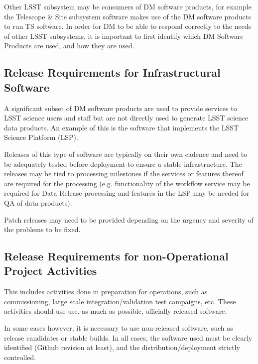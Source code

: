 Other \gls{LSST} subsystem may be consumers of \gls{DM} software products, for example the Telescope \& Site subsystem software makes use of the \gls{DM} software products to run  \gls{TS} software. 
In order for \gls{DM} to be able to respond correctly to the needs of other \gls{LSST} subsystems, it is important to first identify which \gls{DM} Software Products are used, and how they are used.

\subsection{Release Requirements for Infrastructural Software} \label{sec:infreqs}

A significant subset of \gls{DM} software products are used to provide services to \gls{LSST} science users and staff but are not directly used to generate \gls{LSST} science data products. An example of this is the software that implements the \gls{LSST} Science Platform (\gls{LSP}).

Releases of this type of software are typically on their own cadence and need to be adequately tested before deployment to ensure a stable infrastructure. The releases may be tied to processing milestones if the services or features thereof are required for the processing (e.g. functionality of the workflow service may be required for Data Release processing and features in the \gls{LSP} may be needed for \gls{QA} of data products).

Patch releases may need to be provided depending on the urgency and severity of the problems to be fixed.


\subsection{Release Requirements for non-Operational Project Activities} \label{sec:nonopsreqs}

This includes activities done in preparation for operations, such as commissioning, 
large scale integration/validation test campaigns, etc. These activities should use use,  as much as possible,  officially released software.

In some cases however, it is necessary to use non-released software, such as release candidates or stable builds.
In all cases, the software used must be clearly identified (Github revision at least), and the distribution/deployment strictly controlled.

